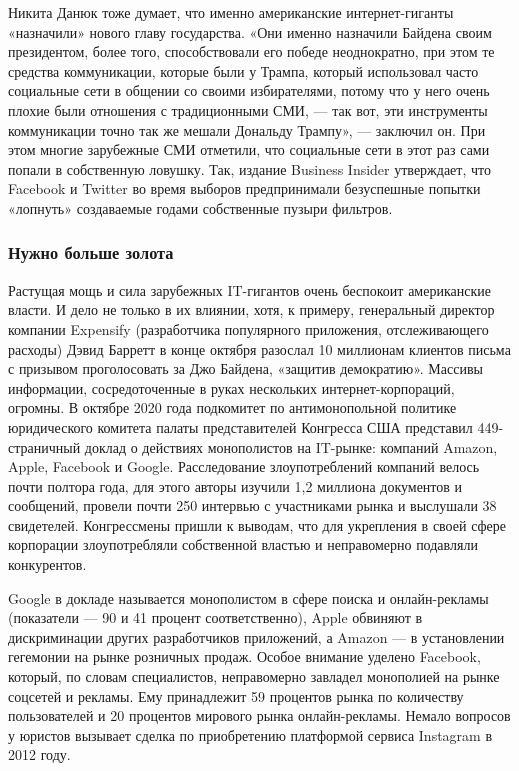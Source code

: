 Никита Данюк тоже думает, что именно американские интернет-гиганты «назначили»
нового главу государства. «Они именно назначили Байдена своим президентом,
более того, способствовали его победе неоднократно, при этом те средства
коммуникации, которые были у Трампа, который использовал часто социальные сети
в общении со своими избирателями, потому что у него очень плохие были отношения
с традиционными СМИ, — так вот, эти инструменты коммуникации точно так же
мешали Дональду Трампу», — заключил он. При этом многие зарубежные СМИ
отметили, что социальные сети в этот раз сами попали в собственную ловушку.
Так, издание Business Insider утверждает, что Facebook и Twitter во время
выборов предпринимали безуспешные попытки «лопнуть» создаваемые годами
собственные пузыри фильтров.

\subsubsection{Нужно больше золота}

Растущая мощь и сила зарубежных IT-гигантов очень беспокоит американские
власти. И дело не только в их влиянии, хотя, к примеру, генеральный директор
компании Expensify (разработчика популярного приложения, отслеживающего
расходы) Дэвид Барретт в конце октября разослал 10 миллионам клиентов письма с
призывом проголосовать за Джо Байдена, «защитив демократию». Массивы
информации, сосредоточенные в руках нескольких интернет-корпораций, огромны. В
октябре 2020 года подкомитет по антимонопольной политике юридического комитета
палаты представителей Конгресса США представил 449-страничный доклад о
действиях монополистов на IT-рынке: компаний Amazon, Apple, Facebook и Google.
Расследование злоупотреблений компаний велось почти полтора года, для этого
авторы изучили 1,2 миллиона документов и сообщений, провели почти 250 интервью
с участниками рынка и выслушали 38 свидетелей. Конгрессмены пришли к выводам,
что для укрепления в своей сфере корпорации злоупотребляли собственной властью
и неправомерно подавляли конкурентов.

Google в докладе называется монополистом в сфере поиска и онлайн-рекламы
(показатели — 90 и 41 процент соответственно), Apple обвиняют в дискриминации
других разработчиков приложений, а Amazon — в установлении гегемонии на рынке
розничных продаж. Особое внимание уделено Facebook, который, по словам
специалистов, неправомерно завладел монополией на рынке соцсетей и рекламы. Ему
принадлежит 59 процентов рынка по количеству пользователей и 20 процентов
мирового рынка онлайн-рекламы. Немало вопросов у юристов вызывает сделка по
приобретению платформой сервиса Instagram в 2012 году.

